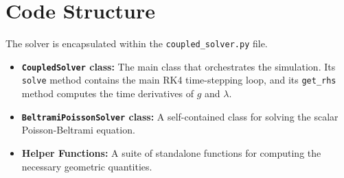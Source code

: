 \documentclass{article}
\begin{document}
\section{Code Structure}
The solver is encapsulated within the \texttt{coupled\_solver.py} file.
\begin{itemize}
    \item \textbf{\texttt{CoupledSolver} class:} The main class that orchestrates the simulation. Its \texttt{solve} method contains the main RK4 time-stepping loop, and its \texttt{get\_rhs} method computes the time derivatives of $g$ and $\lambda$.
    \item \textbf{\texttt{BeltramiPoissonSolver} class:} A self-contained class for solving the scalar Poisson-Beltrami equation.
    \item \textbf{Helper Functions:} A suite of standalone functions for computing the necessary geometric quantities.
\end{itemize}
\end{document}

